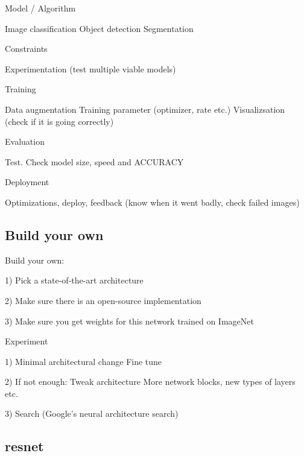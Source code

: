 Model / Algorithm

	Image classification
	Object detection
	Segmentation

	Constraints

	Experimentation (test multiple viable models)

Training

	Data augmentation
	Training parameter (optimizer, rate etc.)
	Visualizsation (check if it is going correctly)

Evaluation

	Test. Check model size, speed and ACCURACY

Deployment

	Optimizations, deploy, feedback (know when it went badly, check failed images)

\subsection{Build your own}

Build your own:

1) Pick a state-of-the-art architecture

2) Make sure there is an open-source implementation

3) Make sure you get weights for this network trained on ImageNet


Experiment

1) Minimal architectural change
	Fine tune

2) If not enough: Tweak architecture
	More network blocks, new types of layers etc.

3) Search (Google's neural architecture search)

\subsection{resnet}

